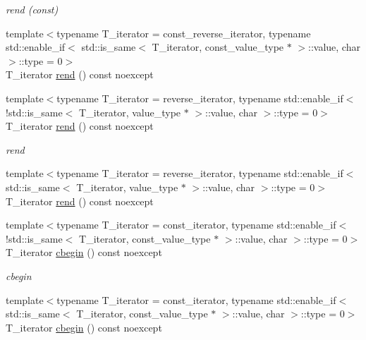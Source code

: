 \begin{DoxyCompactItemize}
\begin{DoxyCompactList}\small\item\em rend (const) \end{DoxyCompactList}\item 
{\footnotesize template$<$typename T\+\_\+iterator  = const\+\_\+reverse\+\_\+iterator, typename std\+::enable\+\_\+if$<$ std\+::is\+\_\+same$<$ T\+\_\+iterator, const\+\_\+value\+\_\+type $\ast$ $>$\+::value, char $>$\+::type  = 0$>$ }\\T\+\_\+iterator \hyperlink{classIceBRG_1_1labeled__array__row__reference_a5a033e4890a28fc1fc854e69892865dd}{rend} () const  noexcept
\item 
{\footnotesize template$<$typename T\+\_\+iterator  = reverse\+\_\+iterator, typename std\+::enable\+\_\+if$<$!std\+::is\+\_\+same$<$ T\+\_\+iterator, value\+\_\+type $\ast$ $>$\+::value, char $>$\+::type  = 0$>$ }\\T\+\_\+iterator \hyperlink{classIceBRG_1_1labeled__array__row__reference_a5a033e4890a28fc1fc854e69892865dd}{rend} () const  noexcept
\begin{DoxyCompactList}\small\item\em rend \end{DoxyCompactList}\item 
{\footnotesize template$<$typename T\+\_\+iterator  = reverse\+\_\+iterator, typename std\+::enable\+\_\+if$<$ std\+::is\+\_\+same$<$ T\+\_\+iterator, value\+\_\+type $\ast$ $>$\+::value, char $>$\+::type  = 0$>$ }\\T\+\_\+iterator \hyperlink{classIceBRG_1_1labeled__array__row__reference_a5a033e4890a28fc1fc854e69892865dd}{rend} () const  noexcept
\item 
{\footnotesize template$<$typename T\+\_\+iterator  = const\+\_\+iterator, typename std\+::enable\+\_\+if$<$!std\+::is\+\_\+same$<$ T\+\_\+iterator, const\+\_\+value\+\_\+type $\ast$ $>$\+::value, char $>$\+::type  = 0$>$ }\\T\+\_\+iterator \hyperlink{classIceBRG_1_1labeled__array__row__reference_a8b451f17a7ae6b69e324fc131a599635}{cbegin} () const  noexcept
\begin{DoxyCompactList}\small\item\em cbegin \end{DoxyCompactList}\item 
{\footnotesize template$<$typename T\+\_\+iterator  = const\+\_\+iterator, typename std\+::enable\+\_\+if$<$ std\+::is\+\_\+same$<$ T\+\_\+iterator, const\+\_\+value\+\_\+type $\ast$ $>$\+::value, char $>$\+::type  = 0$>$ }\\T\+\_\+iterator \hyperlink{classIceBRG_1_1labeled__array__row__reference_a8b451f17a7ae6b69e324fc131a599635}{cbegin} () const  noexcept

\end{DoxyCompactItemize}
